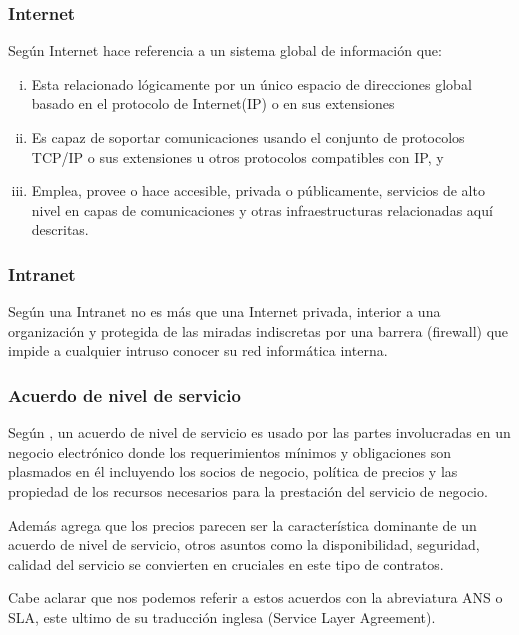 \subsubsection{Internet}
Según \cite{fnc} Internet hace referencia a un sistema global de información que:
\begin{enumerate}[i.]
    \item Esta relacionado lógicamente por un único espacio de direcciones
          global basado en el protocolo de Internet(IP) o en sus extensiones
    \item Es capaz de soportar comunicaciones usando el conjunto de protocolos TCP/IP
          o sus extensiones u otros protocolos compatibles con IP, y
    \item Emplea, provee o hace accesible, privada o públicamente, servicios de
          alto nivel en capas de comunicaciones y otras infraestructuras relacionadas
          aquí descritas.
\end{enumerate}
\subsubsection{Intranet}
Según \cite{lafrance} una Intranet no es más que una Internet privada, interior a una
organización y protegida de las miradas indiscretas por una barrera (firewall) que
impide a cualquier intruso conocer su red informática interna.
\subsubsection{Acuerdo de nivel de servicio}
Según \cite{qianq}, un acuerdo de nivel de servicio es usado por las partes
involucradas en un negocio electrónico donde los requerimientos mínimos y obligaciones son
plasmados en él incluyendo los socios de negocio, política de precios y las propiedad
de los recursos necesarios para la prestación del servicio de negocio.

Además \cite{qianq} agrega que los precios parecen ser la característica dominante
de un acuerdo de nivel de servicio, otros asuntos como la disponibilidad, seguridad,
calidad del servicio se convierten en cruciales en este tipo de contratos.

Cabe aclarar que nos podemos referir a estos acuerdos con la abreviatura ANS o SLA,
este ultimo de su traducción inglesa (Service Layer Agreement).


